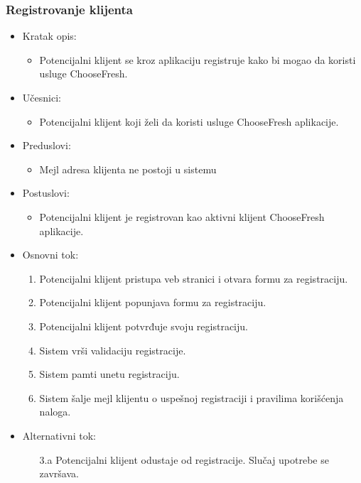 \subsubsection{Registrovanje klijenta}

\begin{itemize}
    \item Kratak opis:
        \begin{itemize}
            \item Potencijalni klijent se kroz aplikaciju registruje kako bi mogao da koristi usluge ChooseFresh.
        \end{itemize}
    \item Učesnici:
        \begin{itemize}
            \item Potencijalni klijent koji želi da koristi usluge ChooseFresh aplikacije.
        \end{itemize}
    \item Preduslovi:
        \begin{itemize}
            \item Mejl adresa klijenta ne postoji u sistemu
        \end{itemize}
    \item Postuslovi:
        \begin{itemize}
            \item Potencijalni klijent je registrovan kao aktivni klijent ChooseFresh aplikacije.
        \end{itemize}
    \item Osnovni tok:
        \begin{enumerate}
            \item Potencijalni klijent pristupa veb stranici i otvara formu za registraciju.
            \item Potencijalni klijent popunjava formu za registraciju.
            \item Potencijalni klijent potvrđuje svoju registraciju.
            \item Sistem vrši validaciju registracije.
            \item Sistem pamti unetu registraciju.
            \item Sistem šalje mejl klijentu o uspešnoj registraciji i pravilima korišćenja naloga.
        \end{enumerate}
    \item Alternativni tok:
        \begin{itemize}
            \item[3.a] Potencijalni klijent odustaje od registracije. Slučaj upotrebe se završava.

\end{itemize}
\end{itemize}
